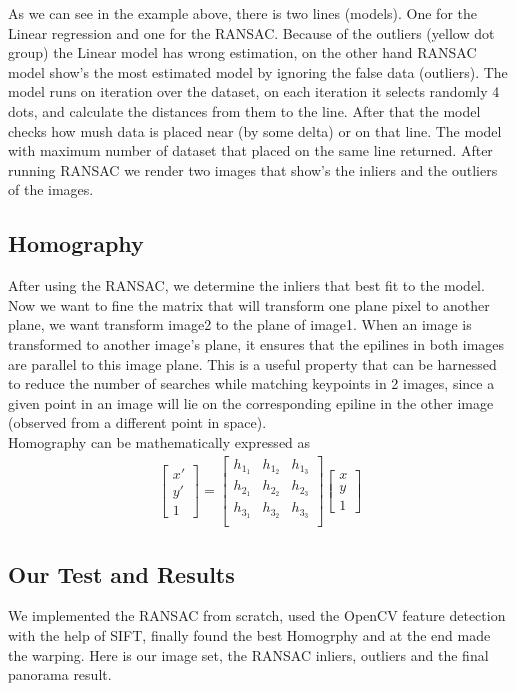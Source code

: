 \documentclass[12pt,a4paper]{report}
\begin{document}
As we can see in the example above, there is two lines (models). One for the Linear regression and one for the RANSAC. Because of the outliers (yellow dot group) the Linear model has wrong estimation, on the other hand RANSAC model show’s the most estimated model by ignoring the false data (outliers). The model runs on iteration over the dataset, on each iteration it selects randomly 4 dots, and calculate the distances from them to the line. After that the model checks how mush data is placed near (by some delta) or on that line. The model with maximum number of dataset that placed on the same line returned.
After running RANSAC we render two images that show’s the inliers and the outliers of the images.

\subsection*{Homography}
After using the RANSAC, we determine the inliers that best fit to the model. Now we want to fine the matrix that will transform one plane pixel to another plane, we want transform image2 to the plane of image1.
When an image is transformed to another image’s plane, it ensures that the epilines in both images are parallel to this image plane. This is a useful property that can be harnessed to reduce the number of searches while matching keypoints in 2 images, since a given point in an image will lie on the corresponding epiline in the other image (observed from a different point in space). 
\\
Homography can be mathematically expressed as 
\begin{gather*}
\begin{bmatrix}x' \\ y' \\ 1 \end{bmatrix}
 =
  \begin{bmatrix}
    h_1_1      & h_1_2       & h_1_3     \\
    h_2_1      & h_2_2      & h_2_3    \\
    h_3_1      & h_3_2      & h_3_3    \\
\end{bmatrix}
    \begin{bmatrix}x \\ y \\ 1 \end{bmatrix}
\end{gather*}
\newpage

\subsection*{Our Test and Results}
We implemented the RANSAC from scratch, used the OpenCV feature detection with the help of SIFT, finally found the best Homogrphy and at the end made the warping. Here is our image set, the RANSAC inliers, outliers and the final panorama result.
\end{document}

